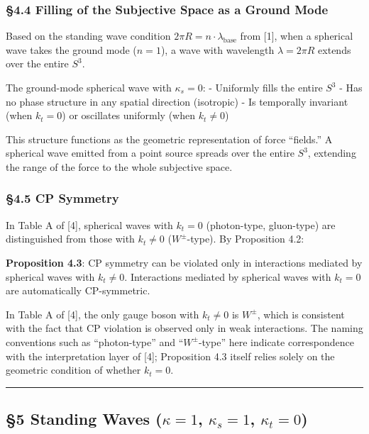 \documentclass[
  a4paper,11pt]{article}
\theoremstyle{definition}
\theoremstyle{remark}
\begin{document}
\subsubsection{§4.4 Filling of the Subjective Space as a Ground
Mode}\label{filling-of-the-subjective-space-as-a-ground-mode}

Based on the standing wave condition
\(2\pi R = n \cdot \lambda_{\text{base}}\) from {[}1{]}, when a
spherical wave takes the ground mode (\(n = 1\)), a wave with wavelength
\(\lambda = 2\pi R\) extends over the entire \(S^3\).

The ground-mode spherical wave with \(\kappa_s = 0\): - Uniformly fills
the entire \(S^3\) - Has no phase structure in any spatial direction
(isotropic) - Is temporally invariant (when \(k_t = 0\)) or oscillates
uniformly (when \(k_t \neq 0\))

This structure functions as the geometric representation of force
``fields.'' A spherical wave emitted from a point source spreads over
the entire \(S^3\), extending the range of the force to the whole
subjective space.

\subsubsection{§4.5 CP Symmetry}\label{cp-symmetry}

In Table A of {[}4{]}, spherical waves with \(k_t = 0\) (photon-type,
gluon-type) are distinguished from those with \(k_t \neq 0\)
(\(W^{\pm}\)-type). By Proposition 4.2:

\textbf{Proposition 4.3}: CP symmetry can be violated only in
interactions mediated by spherical waves with \(k_t \neq 0\).
Interactions mediated by spherical waves with \(k_t = 0\) are
automatically CP-symmetric.

In Table A of {[}4{]}, the only gauge boson with \(k_t \neq 0\) is
\(W^{\pm}\), which is consistent with the fact that CP violation is
observed only in weak interactions. The naming conventions such as
``photon-type'' and ``\(W^{\pm}\)-type'' here indicate correspondence
with the interpretation layer of {[}4{]}; Proposition 4.3 itself relies
solely on the geometric condition of whether \(k_t = 0\).

\begin{center}\rule{0.5\linewidth}{0.5pt}\end{center}

\subsection{\texorpdfstring{§5 Standing Waves (\(\kappa = 1\),
\(\kappa_s = 1\),
\(\kappa_t = 0\))}{§5 Standing Waves (\textbackslash kappa = 1, \textbackslash kappa\_s = 1, \textbackslash kappa\_t = 0)}}\label{standing-waves-kappa-1-kappa_s-1-kappa_t-0}
\end{document}
